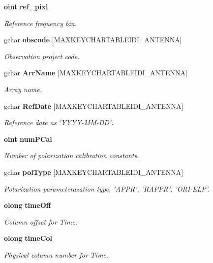 \begin{CompactItemize}
{\bf oint} {\bf ref\_\-pixl}
\begin{CompactList}\small\item\em Reference frequency bin. \item\end{CompactList}\item 
gchar {\bf obscode} [MAXKEYCHARTABLEIDI\_\-ANTENNA]
\begin{CompactList}\small\item\em Observation project code. \item\end{CompactList}\item 
gchar {\bf Arr\-Name} [MAXKEYCHARTABLEIDI\_\-ANTENNA]
\begin{CompactList}\small\item\em Array name. \item\end{CompactList}\item 
gchar {\bf Ref\-Date} [MAXKEYCHARTABLEIDI\_\-ANTENNA]
\begin{CompactList}\small\item\em Reference date as \char`\"{}YYYY-MM-DD\char`\"{}. \item\end{CompactList}\item 
{\bf oint} {\bf num\-PCal}
\begin{CompactList}\small\item\em Number of polarization calibration constants. \item\end{CompactList}\item 
gchar {\bf pol\-Type} [MAXKEYCHARTABLEIDI\_\-ANTENNA]
\begin{CompactList}\small\item\em Polarization parameterazation type, 'APPR', 'RAPPR', 'ORI-ELP'. \item\end{CompactList}\item 
{\bf olong} {\bf time\-Off}
\begin{CompactList}\small\item\em Column offset for Time. \item\end{CompactList}\item 
{\bf olong} {\bf time\-Col}
\begin{CompactList}\small\item\em Physical column number for Time. \item\end{CompactList}\item 

\end{CompactItemize}
